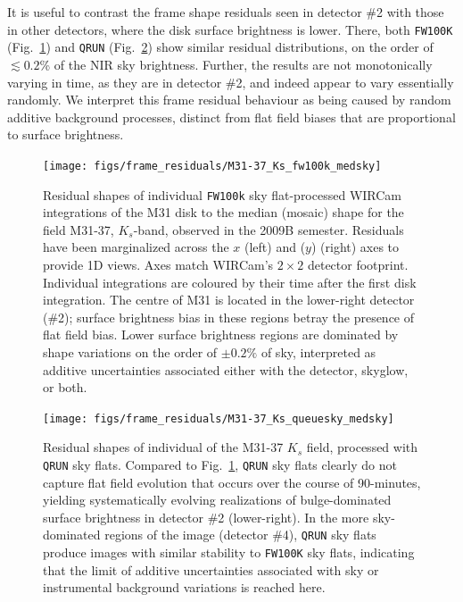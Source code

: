 \documentclass[iop]{emulateapj}
\newcommand{\mycomment}[1]{\textcolor{OliveGreen}{\textit{#1}}} %
\newcommand{\Fig}[1]{Fig.~\ref{fig:#1}}  %
\begin{document}
It is useful to contrast the frame shape residuals seen in detector \#2 with those in other detectors, where the disk surface brightness is lower.
There, both \texttt{FW100K} (\Fig{frame_residuals_M31-37_Ks_fw100k_medsky}) and \texttt{QRUN} (\Fig{frame_residuals_M31-37_Ks_QRUN}) show similar residual distributions, on the order of $\lesssim 0.2$\% of the NIR sky brightness.
Further, the results are not monotonically varying in time, as they are in detector \#2, and indeed appear to vary essentially randomly.
We interpret this frame residual behaviour as being caused by random additive background processes, distinct from flat field biases that are proportional to surface brightness.


\begin{figure}[p]
\centering
\texttt{[image: figs/frame\_residuals/M31-37\_Ks\_fw100k\_medsky]}
\caption{Residual shapes of individual \texttt{FW100k} sky flat-processed WIRCam integrations of the M31 disk to the median (mosaic) shape for the field M31-37, $K_s$-band, observed in the 2009B semester.
Residuals have been marginalized across the $x$ (left) and ($y$) (right) axes to provide 1D views.
Axes match WIRCam's $2\times2$ detector footprint.
Individual integrations are coloured by their time after the first disk integration.
The centre of M31 is located in the lower-right detector (\#2); surface brightness bias in these regions betray the presence of flat field bias. Lower surface brightness regions are dominated by shape variations on the order of $\pm 0.2\%$ of sky, interpreted as additive uncertainties associated either with the detector, skyglow, or both.}
\label{fig:frame_residuals_M31-37_Ks_fw100k_medsky}
\end{figure}


\begin{figure}[p]
\centering
\texttt{[image: figs/frame\_residuals/M31-37\_Ks\_queuesky\_medsky]}
\caption{Residual shapes of individual of the M31-37 $K_s$ field, processed with \texttt{QRUN} sky flats.
Compared to \Fig{frame_residuals_M31-37_Ks_fw100k_medsky}, \texttt{QRUN} sky flats clearly do not capture flat field evolution that occurs over the course of 90-minutes, yielding systematically evolving realizations of bulge-dominated surface brightness in detector \#2 (lower-right). In the more sky-dominated regions of the image (detector \#4), \texttt{QRUN} sky flats produce images with similar stability to \texttt{FW100K} sky flats, indicating that the limit of additive uncertainties associated with sky or instrumental background variations is reached here.}
\label{fig:frame_residuals_M31-37_Ks_QRUN}
\end{figure}
\end{document}
